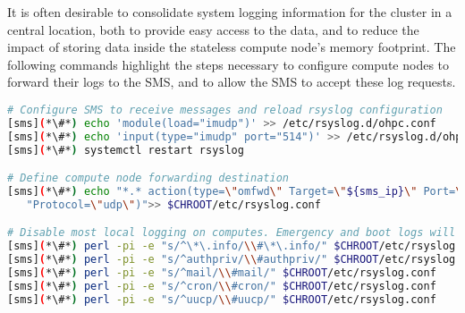 It is often desirable to consolidate system logging information for the cluster in a
central location, both to provide easy access to the data, and to reduce the
impact of storing data inside the stateless compute node's memory footprint. The
following commands highlight the steps necessary to configure compute nodes to
forward their logs to the SMS, and to allow the SMS to accept these log requests.


\begin{lstlisting}[language=bash,keywords={}]
# Configure SMS to receive messages and reload rsyslog configuration
[sms](*\#*) echo 'module(load="imudp")' >> /etc/rsyslog.d/ohpc.conf
[sms](*\#*) echo 'input(type="imudp" port="514")' >> /etc/rsyslog.d/ohpc.conf
[sms](*\#*) systemctl restart rsyslog

# Define compute node forwarding destination
[sms](*\#*) echo "*.* action(type=\"omfwd\" Target=\"${sms_ip}\" Port=\"514\" " \
   "Protocol=\"udp\")">> $CHROOT/etc/rsyslog.conf

# Disable most local logging on computes. Emergency and boot logs will remain on the compute nodes
[sms](*\#*) perl -pi -e "s/^\*\.info/\\#\*\.info/" $CHROOT/etc/rsyslog.conf
[sms](*\#*) perl -pi -e "s/^authpriv/\\#authpriv/" $CHROOT/etc/rsyslog.conf
[sms](*\#*) perl -pi -e "s/^mail/\\#mail/" $CHROOT/etc/rsyslog.conf
[sms](*\#*) perl -pi -e "s/^cron/\\#cron/" $CHROOT/etc/rsyslog.conf
[sms](*\#*) perl -pi -e "s/^uucp/\\#uucp/" $CHROOT/etc/rsyslog.conf

\end{lstlisting}
